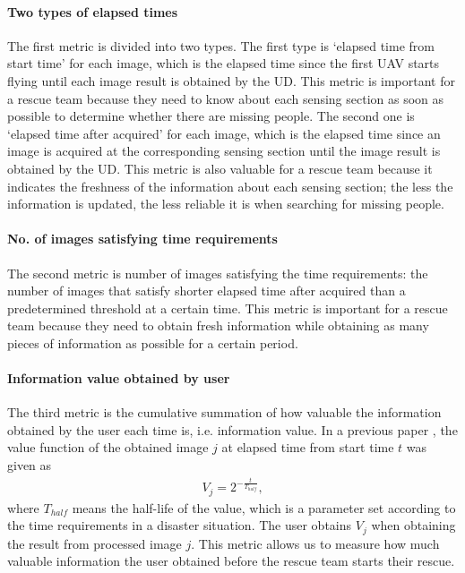 \documentclass{ieeeaccess}
\begin{document}
\paragraph*{Two types of elapsed times}
The first metric is divided into two types. 
The first type is `elapsed time from start time' for each image, which is the elapsed time since the first UAV starts flying until each image result is obtained by the UD. 
This metric is important for a rescue team because they need to know about each sensing section as soon as possible to determine whether there are missing people. 
The second one is `elapsed time after acquired' for each image, which is the elapsed time since an image is acquired at the corresponding sensing section until the image result is obtained by the UD. This metric is also valuable for a rescue team because it indicates the freshness of the information about each sensing section; the less the information is updated, the less reliable it is when searching for missing people.

\paragraph*{No. of images satisfying time requirements}
The second metric is number of images satisfying the time requirements: the number of images that satisfy shorter elapsed time after acquired than a predetermined threshold at a certain time. This metric is important for a rescue team because they need to obtain fresh information while obtaining as many pieces of information as possible for a certain period.

\paragraph*{Information value obtained by user}
The third metric is the cumulative summation of how valuable the information obtained by the user each time is, i.e. information value. In a previous paper \cite{NOMURA2001}, the value function of the obtained image $j$ at elapsed time from start time $t$ was given as
\begin{align}
V_j=2^{-\frac{t}{T_{half}}}, \label{eq_value}
\end{align}
where $T_{half}$ means the half-life of the value, which is a parameter set according to the time requirements in a disaster situation. The user obtains $V_j$ when obtaining the result from processed image $j$. This metric allows us to measure how much valuable information the user obtained before the rescue team starts their rescue. 
\end{document}
